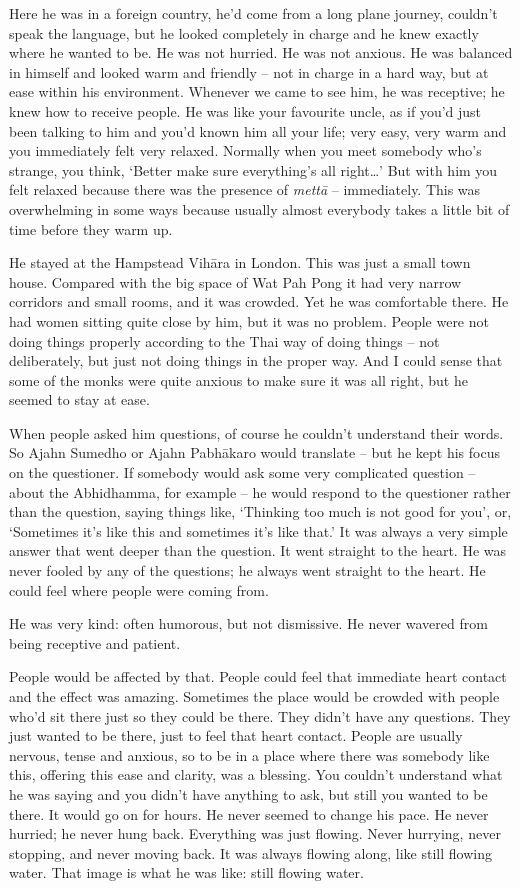 Here he was in a foreign country, he'd come from a long plane journey, 
couldn't speak the language, but he looked completely in charge and he
knew exactly where he wanted to be. He was not hurried. He was not
anxious. He was balanced in himself and looked warm and friendly -- not
in charge in a hard way, but at ease within his environment. Whenever we
came to see him, he was receptive; he knew how to receive people. He was
like your favourite uncle, as if you'd just been talking to him and
you'd known him all your life; very easy, very warm and you immediately
felt very relaxed. Normally when you meet somebody who's strange, you
think, `Better make sure everything's all right\ldots{}' But with him
you felt relaxed because there was the presence of \emph{mettā} --
immediately. This was overwhelming in some ways because usually almost
everybody takes a little bit of time before they warm up.

He stayed at the Hampstead Vihāra in London. This was just a small town
house. Compared with the big space of Wat Pah Pong it had very narrow
corridors and small rooms, and it was crowded. Yet he was comfortable
there. He had women sitting quite close by him, but it was no problem. 
People were not doing things properly according to the Thai way of doing
things -- not deliberately, but just not doing things in the proper way. 
And I could sense that some of the monks were quite anxious to make sure
it was all right, but he seemed to stay at ease. 

When people asked him questions, of course he couldn't understand their
words. So Ajahn Sumedho or Ajahn Pabhākaro would translate -- but he
kept his focus on the questioner. If somebody would ask some very
complicated question -- about the Abhidhamma, for example -- he
would respond to the questioner rather than the question, saying things
like, `Thinking too much is not good for you', or, `Sometimes it's like
this and sometimes it's like that.' It was always a very simple answer
that went deeper than the question. It went straight to the heart. He
was never fooled by any of the questions; he always went straight to the
heart. He could feel where people were coming from. 

He was very kind: often humorous, but not dismissive. He never wavered
from being receptive and patient. 

People would be affected by that. People could feel that immediate heart
contact and the effect was amazing. Sometimes the place would be crowded
with people who'd sit there just so they could be there. They didn't
have any questions. They just wanted to be there, just to feel that
heart contact. People are usually nervous, tense and anxious, so to be
in a place where there was somebody like this, offering this ease and
clarity, was a blessing. You couldn't understand what he was saying and
you didn't have anything to ask, but still you wanted to be there. It
would go on for hours. He never seemed to change his pace. He never
hurried; he never hung back. Everything was just flowing. Never
hurrying, never stopping, and never moving back. It was always flowing
along, like still flowing water. That image is what he was like: still
flowing water. 

